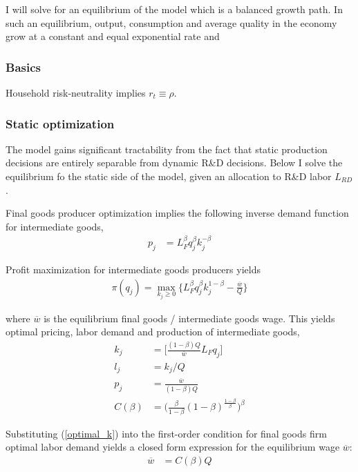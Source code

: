 \documentclass[12pt,english]{article}
\theoremstyle{remark}
\begin{document}
I will solve for an equilibrium of the model which is a balanced growth path. In such an equilibrium, output, consumption and average quality in the economy grow at a constant and equal exponential rate and 

\subsubsection{Basics}

Household risk-neutrality implies $r_t \equiv \rho$.

\subsubsection{Static optimization}

The model gains significant tractability from the fact that static production decisions are entirely separable from dynamic R\&D decisions. Below I solve the equilibrium fo the static side of the model, given an allocation to R\&D labor $L_{RD}$. 

Final goods producer optimization implies the following inverse demand function for intermediate goods, 
\begin{align*}
	p_j &= L_F^{\beta} q_j^{\beta} k_j^{-\beta}	
\end{align*}

Profit maximization for intermediate goods producers yields
\begin{align}
\pi(q_j) = \max_{k_j \ge 0} \Big\{ L_F^{\beta} q_j^{\beta} k_j^{1-\beta} - \frac{\overline{w}}{Q} \Big\} \label{incumbent_profit}
\end{align}

where $\overline{w}$ is the equilibrium final goods / intermediate goods wage.
This yields optimal pricing, labor demand and production of intermediate goods,
\begin{align}
k_j &= \Big[ \frac{(1-\beta) Q}{\overline{w}} L_F q_j  \Big] \label{optimal_k}\\
l_j &= k_j / Q \label{optimal_l}\\
p_j &= \frac{\overline{w}}{(1-\beta) Q} \label{optimal_p}\\
C(\beta) &= \Big(\frac{\beta}{1-\beta} (1-\beta)^{\frac{1-\beta}{\beta}} \Big)^{\beta} \label{def_cbeta}
\end{align}

Substituting (\ref{optimal_k}) into the first-order condition for final goods firm optimal labor demand yields a closed form expression for the equilibrium wage $\overline{w}$:
\begin{align}
	\overline{w} &= C(\beta) Q \label{wbar}
\end{align}
\end{document}
